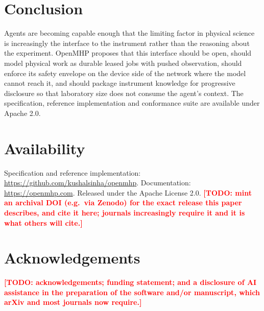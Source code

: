 \documentclass[11pt]{article}
\newcommand{\TODO}[1]{\textcolor{red}{\textbf{[TODO: #1]}}}
\begin{document}
\section{Conclusion}

Agents are becoming capable enough that the limiting factor in physical science is
increasingly the interface to the instrument rather than the reasoning about the experiment.
OpenMHP proposes that this interface should be open, should model physical work as durable
leased jobs with pushed observation, should enforce its safety envelope on the device side of
the network where the model cannot reach it, and should package instrument knowledge for
progressive disclosure so that laboratory size does not consume the agent's context. The
specification, reference implementation and conformance suite are available under Apache 2.0.

\section*{Availability}

Specification and reference implementation: \url{https://github.com/kushalsinha/openmhp}.
Documentation: \url{https://openmhp.com}. Released under the Apache License 2.0.
\TODO{mint an archival DOI (e.g.\ via Zenodo) for the exact release this paper describes, and
cite it here; journals increasingly require it and it is what others will cite.}

\section*{Acknowledgements}
\TODO{acknowledgements; funding statement; and a disclosure of AI assistance in the
preparation of the software and/or manuscript, which arXiv and most journals now require.}
\end{document}
